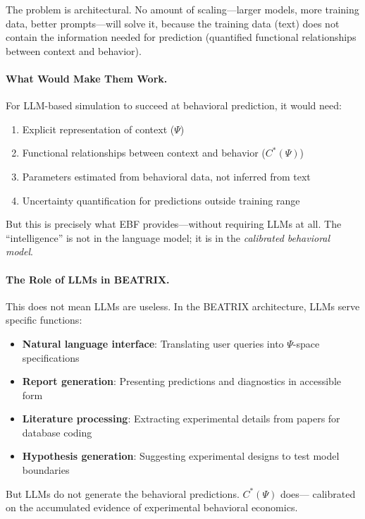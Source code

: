 The problem is architectural. No amount of scaling---larger models, more
training data, better prompts---will solve it, because the training data
(text) does not contain the information needed for prediction (quantified
functional relationships between context and behavior).

\paragraph{What Would Make Them Work.}
For LLM-based simulation to succeed at behavioral prediction, it would need:
\begin{enumerate}
    \item Explicit representation of context ($\Psi$)
    \item Functional relationships between context and behavior ($C^*(\Psi)$)
    \item Parameters estimated from behavioral data, not inferred from text
    \item Uncertainty quantification for predictions outside training range
\end{enumerate}

But this is precisely what EBF provides---without requiring LLMs at all.
The ``intelligence'' is not in the language model; it is in the
\emph{calibrated behavioral model}.

\paragraph{The Role of LLMs in BEATRIX.}
This does not mean LLMs are useless. In the BEATRIX architecture, LLMs serve
specific functions:
\begin{itemize}
    \item \textbf{Natural language interface}: Translating user queries into
          $\Psi$-space specifications
    \item \textbf{Report generation}: Presenting predictions and diagnostics
          in accessible form
    \item \textbf{Literature processing}: Extracting experimental details from
          papers for database coding
    \item \textbf{Hypothesis generation}: Suggesting experimental designs to
          test model boundaries
\end{itemize}

But LLMs do not generate the behavioral predictions. $C^*(\Psi)$ does---
calibrated on the accumulated evidence of experimental behavioral economics.

